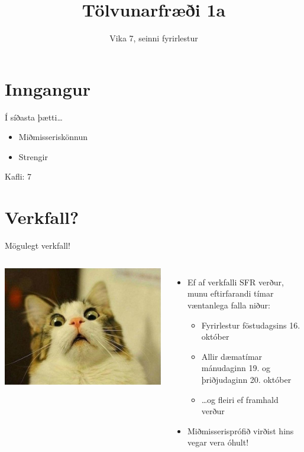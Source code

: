 \documentclass{beamer}
\title{Tölvunarfræði 1a}
\subtitle{Vika 7, seinni fyrirlestur}
\begin{document}
\begin{frame}
\titlepage
\end{frame}

\section{Inngangur}

\begin{frame}{Í síðasta þætti\ldots}
\begin{itemize}
 \item Miðmisseriskönnun
 \item Strengir
\end{itemize}
Kafli: 7 
\end{frame}

\section{Verkfall?}

\begin{frame}{Mögulegt verkfall!}
\begin{columns}
\pause
\includegraphics[width=\linewidth]{Pics/scared-cat}
\pause
\begin{itemize}
 \item Ef af verkfalli SFR verður, munu eftirfarandi tímar væntanlega falla niður:
 \begin{itemize}
  \item Fyrirlestur föstudagsins 16. október
  \item Allir dæmatímar mánudaginn 19. og þriðjudaginn 20. október
  \item \ldots og fleiri ef framhald verður
 \end{itemize}
 \item Miðmisserisprófið virðist hins vegar vera óhult!
\end{itemize}
\end{columns}
\end{frame}
\end{document}
